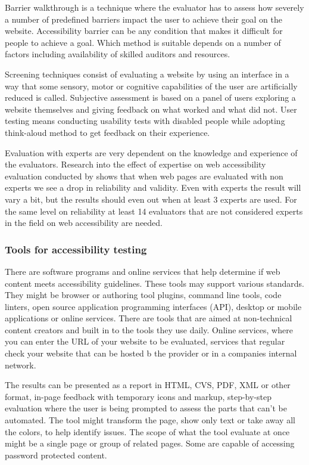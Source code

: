 \documentclass{master_thesis}
\begin{document}
Barrier walkthrough is a technique where the evaluator has to assess how severely a number of predefined barriers impact the user to achieve their goal on the website. Accessibility barrier can be any condition that makes it difficult for people to achieve a goal. Which method is suitable depends on a number of factors including availability of skilled auditors and resources. \citep{Brajnik2008}

Screening techniques consist of evaluating a website by using an interface in a way that some sensory, motor or cognitive capabilities of the user are artificially reduced is called. Subjective assessment is based on a panel of users exploring a website themselves and giving feedback on what worked and what did not. User testing means conducting usability tests with disabled people while adopting think-aloud method to get feedback on their experience. \citep{Brajnik2008}

Evaluation with experts are very dependent on the knowledge and experience of the evaluators. Research into the effect of expertise on web accessibility evaluation conducted by \citeauthor{Brajnik2011} shows that when web pages are evaluated with non experts we see a drop in reliability and validity. Even with experts the result will vary a bit, but the results should even out when at least 3 experts are used. For the same level on reliability at least 14 evaluators that are not considered experts in the field on web accessibility are needed. \citep{Brajnik2011}

\subsubsection{Tools for accessibility testing}

There are software programs and online services that help determine if web content meets accessibility guidelines. These tools may support various standards. They might be browser or authoring tool plugins, command line tools, code linters, open source application programming interfaces (API), desktop or mobile applications or online services. There are tools that are aimed at non-technical content creators and built in to the tools they use daily. Online services, where you can enter the URL of your website to be evaluated, services that regular check your website that can be hosted b the provider or in a companies internal network. \citep{AbouZahra2017}

The results can be presented as a report in HTML, CVS, PDF, XML or other format, in-page feedback with temporary icons and markup, step-by-step evaluation where the user is being prompted to assess the parts that can't be automated. The tool might transform the page, show only text or take away all the colors, to help identify issues. The scope of what the tool evaluate at once might be a single page or group of related pages. Some are capable of accessing password protected content. \citep{AbouZahra2017}
\end{document}
